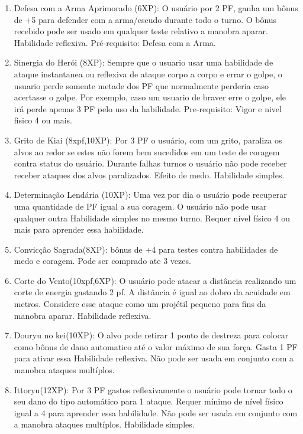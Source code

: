 \begin{enumerate}
	\item Defesa com a Arma Aprimorado (6XP): O usuário por 2 PF, ganha um bônus de +5 para defender com a arma/escudo durante todo o turno. O bônus recebido pode ser usado em qualquer teste relativo a manobra aparar. Habilidade reflexiva. Pré-requisito: Defesa com a Arma.
	
	\item Sinergia do Herói (8XP): Sempre que o usuario usar uma habilidade de ataque instantanea ou reflexiva de ataque corpo a corpo e errar o golpe, o usuario perde somente metade dos PF que normalmente perderia caso acertasse o golpe. Por exemplo, caso um usuario de braver erre o golpe, ele irá perde apenas 3 PF pelo uso da habilidade. Pre-requisito: Vigor e nivel fisico 4 ou mais.

	\item Grito de Kiai (8xpf,10XP): Por 3 PF o usuário, com um grito, paraliza os alvos ao redor se estes não forem bem sucedidos em um teste de coragem contra status do usuário. Durante falhas turnos o usuário não pode receber receber ataques dos alvos paralizados. Efeito de medo. Habilidade simples.

	\item Determinação Lendária (10XP): Uma vez por dia o usuário pode recuperar uma quantidade de PF igual a sua coragem. O usuário não pode usar qualquer outra Habilidade simples no mesmo turno. Requer nível físico 4 ou mais para aprender essa habilidade. 

	\item Convicção Sagrada(8XP): bônus de +4 para testes contra habilidades de medo e coragem. Pode ser comprado ate 3 vezes.

	\item Corte do Vento(10xpf,6XP): O usuário pode atacar a distância realizando um corte de energia gastando 2 pf. A distância é igual ao dobro da acuidade em metros. Considere esse ataque como um projétil pequeno para fins da manobra aparar. Habilidade reflexiva.
        
\item Douryu no kei(10XP): O alvo pode retirar 1 ponto de destreza para colocar como bônus de dano automatico até o valor máximo de sua força. Gasta 1 PF para ativar essa Habilidade reflexiva. Não pode ser usada em conjunto com a manobra ataques multíplos.

	\item Ittoryu(12XP): Por 3 PF gastos reflexivamente o usuário pode tornar todo o seu dano do tipo automático para 1 ataque. Requer mínimo de nível físico igual a 4 para aprender essa habilidade. Não pode ser usada em conjunto com a manobra ataques multíplos. Habilidade simples.
	

\end{enumerate}

